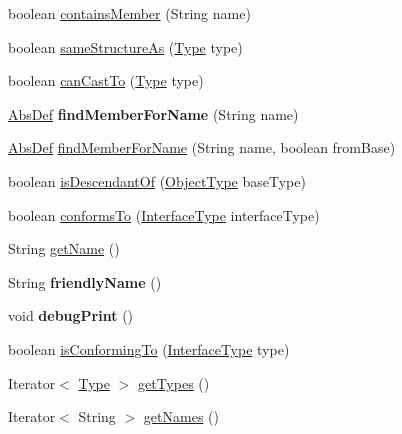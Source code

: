 \begin{DoxyCompactItemize}
boolean \hyperlink{classcompiler_1_1seman_1_1type_1_1_object_type_a9638597ad48a5f7f5ffee7e4c97d99b3}{contains\+Member} (String name)
\item 
boolean \hyperlink{classcompiler_1_1seman_1_1type_1_1_object_type_a943e5eb0e4e688e93d21915905d741ca}{same\+Structure\+As} (\hyperlink{classcompiler_1_1seman_1_1type_1_1_type}{Type} type)
\item 
boolean \hyperlink{classcompiler_1_1seman_1_1type_1_1_object_type_ac940eace62f8f20a25e3d6f0d06565ed}{can\+Cast\+To} (\hyperlink{classcompiler_1_1seman_1_1type_1_1_type}{Type} type)
\item 
\mbox{\label{classcompiler_1_1seman_1_1type_1_1_object_type_ab00b1b92ba5433597064fc2e6aed4e36}} 
\hyperlink{classcompiler_1_1abstr_1_1tree_1_1def_1_1_abs_def}{Abs\+Def} {\bfseries find\+Member\+For\+Name} (String name)
\item 
\hyperlink{classcompiler_1_1abstr_1_1tree_1_1def_1_1_abs_def}{Abs\+Def} \hyperlink{classcompiler_1_1seman_1_1type_1_1_object_type_adc1d6f8388c93b1229ae57d36eefa87d}{find\+Member\+For\+Name} (String name, boolean from\+Base)
\item 
boolean \hyperlink{classcompiler_1_1seman_1_1type_1_1_object_type_af8027240543efb9e80b624ef01728f57}{is\+Descendant\+Of} (\hyperlink{classcompiler_1_1seman_1_1type_1_1_object_type}{Object\+Type} base\+Type)
\item 
boolean \hyperlink{classcompiler_1_1seman_1_1type_1_1_object_type_aaedfa8514dec5c2ad15bf07b098db072}{conforms\+To} (\hyperlink{classcompiler_1_1seman_1_1type_1_1_interface_type}{Interface\+Type} interface\+Type)
\item 
String \hyperlink{classcompiler_1_1seman_1_1type_1_1_object_type_ad5b6cfd1d8f592ee6e9b8f11ad17f2a4}{get\+Name} ()
\item 
\mbox{\label{classcompiler_1_1seman_1_1type_1_1_object_type_ac577c2d68f286693573e511e6dd674f0}} 
String {\bfseries friendly\+Name} ()
\item 
\mbox{\label{classcompiler_1_1seman_1_1type_1_1_object_type_ac7df754383a88bed3d5fe0de01705583}} 
void {\bfseries debug\+Print} ()
\item 
boolean \hyperlink{classcompiler_1_1seman_1_1type_1_1_object_type_a6e0cc3c8354cb58ea2403259098e1e8f}{is\+Conforming\+To} (\hyperlink{classcompiler_1_1seman_1_1type_1_1_interface_type}{Interface\+Type} type)
\item 
Iterator$<$ \hyperlink{classcompiler_1_1seman_1_1type_1_1_type}{Type} $>$ \hyperlink{classcompiler_1_1seman_1_1type_1_1_object_type_a30c47810a216fd8ab146e0edd2d74aa1}{get\+Types} ()
\item 
Iterator$<$ String $>$ \hyperlink{classcompiler_1_1seman_1_1type_1_1_object_type_a1dbc1ca80ceb1bd8be7a499e8afa8478}{get\+Names} ()
\end{DoxyCompactItemize}
